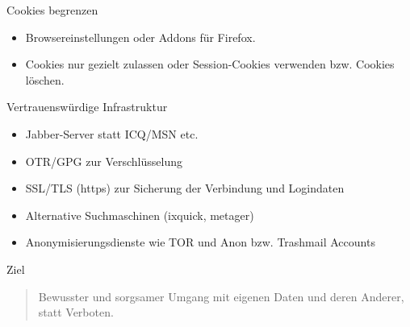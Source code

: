 \begin{frame}{Cookies begrenzen}
	\begin{itemize}
		\item Browsereinstellungen oder Addons f\"ur Firefox.
		\item Cookies nur gezielt zulassen oder Session-Cookies verwenden bzw. Cookies l\"oschen.
	\end{itemize}
\end{frame}

\begin{frame}{Vertrauenswürdige Infrastruktur}
	\begin{itemize}
		\item Jabber-Server statt ICQ/MSN etc.
		\item OTR/GPG zur Verschl\"usselung
		\item SSL/TLS (https) zur Sicherung der Verbindung und Logindaten
		\item Alternative Suchmaschinen (ixquick, metager)
		\item Anonymisierungsdienste wie TOR und Anon bzw. Trashmail Accounts
	\end{itemize}
\end{frame}

\begin{frame}{Ziel}
	\begin{quotation}
		Bewusster und sorgsamer Umgang mit eigenen Daten und deren Anderer, statt Verboten.
	\end{quotation}

\end{frame}


